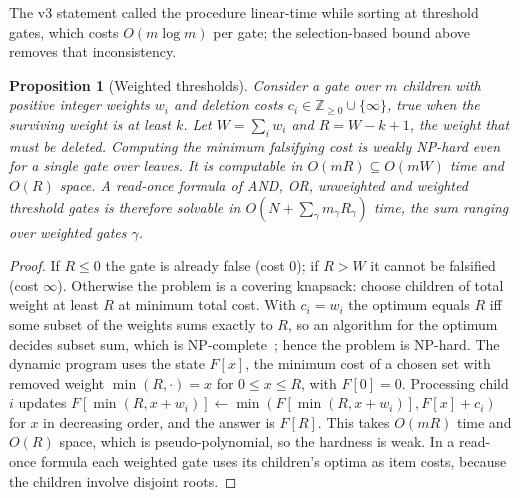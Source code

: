 \documentclass[pdflatex,sn-mathphys-num,twocolumn]{sn-jnl}
\theoremstyle{plain}
\newtheorem{proposition}[theorem]{Proposition}
\theoremstyle{definition}
\begin{document}
The v3 statement called the procedure linear-time while sorting at threshold gates, which costs $O(m\log m)$ per gate; the selection-based bound above removes that inconsistency.

\begin{proposition}[Weighted thresholds]\label{prop:weighted}
Consider a gate over $m$ children with positive integer weights $w_i$ and deletion costs $c_i\in\mathbb{Z}_{\ge0}\cup\{\infty\}$, true when the surviving weight is at least $k$. Let $W=\sum_iw_i$ and $R=W-k+1$, the weight that must be deleted. Computing the minimum falsifying cost is weakly NP-hard even for a single gate over leaves. It is computable in $O(mR)\subseteq O(mW)$ time and $O(R)$ space. A read-once formula of AND, OR, unweighted and weighted threshold gates is therefore solvable in $O(N+\sum_{\gamma}m_\gamma R_\gamma)$ time, the sum ranging over weighted gates $\gamma$.
\end{proposition}
\begin{proof}
If $R\le0$ the gate is already false (cost $0$); if $R>W$ it cannot be falsified (cost $\infty$). Otherwise the problem is a covering knapsack: choose children of total weight at least $R$ at minimum total cost. With $c_i=w_i$ the optimum equals $R$ iff some subset of the weights sums exactly to $R$, so an algorithm for the optimum decides subset sum, which is NP-complete~\cite{karp1972}; hence the problem is NP-hard. The dynamic program uses the state $F[x]$, the minimum cost of a chosen set with removed weight $\min(R,\cdot)=x$ for $0\le x\le R$, with $F[0]=0$. Processing child $i$ updates $F[\min(R,x+w_i)]\leftarrow\min(F[\min(R,x+w_i)],F[x]+c_i)$ for $x$ in decreasing order, and the answer is $F[R]$. This takes $O(mR)$ time and $O(R)$ space, which is pseudo-polynomial, so the hardness is weak. In a read-once formula each weighted gate uses its children's optima as item costs, because the children involve disjoint roots.
\end{proof}
\end{document}
